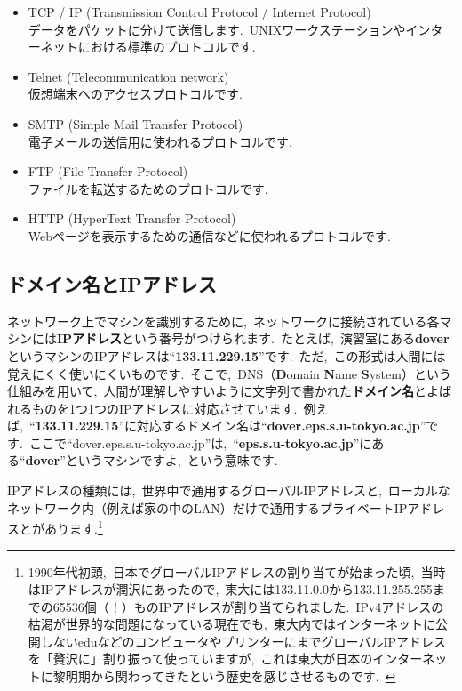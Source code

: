 \documentclass{jarticle}
\begin{document}
\begin{itemize}
\item TCP / IP (Transmission Control Protocol / Internet Protocol)\\
データをパケットに分けて送信します.\ UNIXワークステーションやインターネットにおける標準のプロトコルです.\ 
\item Telnet (Telecommunication network)\\
仮想端末へのアクセスプロトコルです.\ 
\item SMTP (Simple Mail Transfer Protocol)\\
電子メールの送信用に使われるプロトコルです.\ 
\item FTP (File Transfer Protocol)\\
ファイルを転送するためのプロトコルです.\ 
\item HTTP (HyperText Transfer Protocol)\\
Webページを表示するための通信などに使われるプロトコルです.\ 
\end{itemize}

\subsection{ドメイン名とIPアドレス}
ネットワーク上でマシンを識別するために,\ ネットワークに接続されている各マシンには{\bf IPアドレス}という番号がつけられます.\ たとえば,\ 演習室にある{\bf dover}というマシンのIPアドレスは“{\bf 133.11.229.15}”です.\ ただ,\ この形式は人間には覚えにくく使いにくいものです.\ そこで,\ DNS（\textbf{D}omain \textbf{N}ame \textbf{S}ystem）という仕組みを用いて,\ 人間が理解しやすいように文字列で書かれた{\bf ドメイン名}とよばれるものを1つ1つのIPアドレスに対応させています.\ 例えば,\ “{\bf 133.11.229.15}”に対応するドメイン名は“{\bf dover.eps.s.u-tokyo.ac.jp}”です.\ ここで“dover.eps.s.u-tokyo.ac.jp”は,\ “{\bf eps.s.u-tokyo.ac.jp}”にある“{\bf dover}”というマシンですよ,\ という意味です.\ 

IPアドレスの種類には,\ 世界中で通用するグローバルIPアドレスと,\ ローカルなネットワーク内（例えば家の中のLAN）だけで通用するプライベートIPアドレスとがあります.\footnote{1990年代初頭,\ 日本でグローバルIPアドレスの割り当てが始まった頃,\ 当時はIPアドレスが潤沢にあったので,\ 東大には133.11.0.0から133.11.255.255までの65536個（！）ものIPアドレスが割り当てられました.\ IPv4アドレスの枯渇が世界的な問題になっている現在でも,\ 東大内ではインターネットに公開しないeduなどのコンピュータやプリンターにまでグローバルIPアドレスを「贅沢に」割り振って使っていますが,\ これは東大が日本のインターネットに黎明期から関わってきたという歴史を感じさせるものです.\ }
\end{document}
